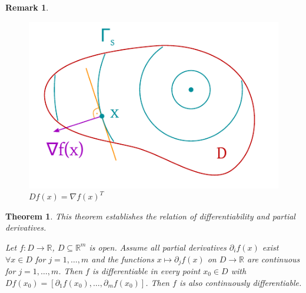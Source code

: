 \documentclass{article}
\newtheorem{theorem}{Theorem}  \numberwithin{theorem}{section}
\newtheorem{remark}{Remark}  \numberwithin{remark}{section}
\begin{document}
\begin{remark}
  \begin{figure}[!h]
    \begin{center}
      \includegraphics{img/33_gradient_2.pdf}
      \caption{$Df(x) = \nabla f(x)^T$}
      \label{img:nab}
    \end{center}
  \end{figure}
\end{remark}

\begin{theorem} %
  \label{thm:rel2}
  This theorem establishes the relation of differentiability and partial derivatives.

  Let $f: D \to \mathbb R$, $D \subseteq \mathbb R^m$ is open.
  Assume all partial derivatives $\partial_i f(x)$ exist $\forall x \in D$ for $j = 1, \dots, m$
  and the functions $x \mapsto \partial_j f(x)$ on $D \to \mathbb R$ are continuous for $j = 1, \dots, m$.
  Then $f$ is differentiable in every point $x_0 \in D$ with $Df(x_0) = [\partial_1 f(x_0), \dots, \partial_m f(x_0)]$.
  Then $f$ is also continuously differentiable.
\end{theorem}
\end{document}
